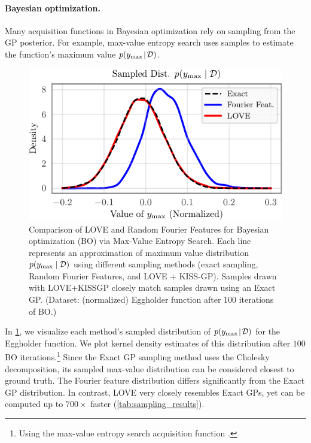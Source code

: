 \paragraph{Bayesian optimization.}
Many acquisition functions in Bayesian optimization rely on sampling from the GP posterior.
For example, max-value entropy search \cite{wang2017max} uses samples to estimate the function's maximum value $p(y_\text{max} \! \mid \! \mathcal D)$.
%
\begin{figure}[t!]
  \centering
  \includegraphics[width=0.65\columnwidth]{figures/love_sampling_comparison.pdf}
  \caption[Comparison of LOVE and Random Fourier Features for Bayesian optimization via Max-Value Entropy Search.]{
    Comparison of LOVE and Random Fourier Features for Bayesian optimization (BO) via Max-Value Entropy Search.
    Each line represents an approximation of maximum value distribution $p(y_\text{max} \mid \mathcal D)$ using different sampling methods (exact sampling, Random Fourier Features, and LOVE + KISS-GP).
    Samples drawn with LOVE+KISSGP closely match samples drawn using an Exact GP.
    (Dataset: (normalized) Eggholder function after 100 iterations of BO.)
    \label{fig:love_sampling_comparison}
  }
\end{figure}
%
In \cref{fig:love_sampling_comparison}, we visualize each method's sampled distribution of $p(y_\text{max} \! \mid \! \mathcal D)$ for the Eggholder function.
We plot kernel density estimates of this distribution after $100$ BO iterations.\footnote{
  Using the max-value entropy search acquisition function \citep{wang2017max}.
}
Since the Exact GP sampling method uses the Cholesky decomposition, its sampled max-value distribution can be considered closest to ground truth.
The Fourier feature distribution differs significantly from the Exact GP distribution.
In contrast, LOVE{} very closely resembles Exact GPs, yet can be computed up to $700 \times$ faster (\cref{tab:sampling_results}).
